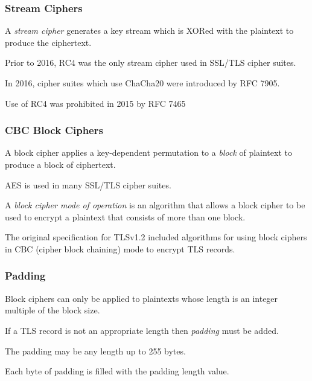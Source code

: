 \documentclass[aspectratio=169]{beamer}
\begin{document}
\begin{frame}[triangle=siiblue]
	\frametitle{Stream Ciphers}
	A \emph{stream cipher} generates a key stream which is XORed with the plaintext to produce the ciphertext.
	
	\vfill
	
	Prior to 2016, RC4 was the only stream cipher used in SSL/TLS cipher suites.
	
	\vfill
	
	In 2016, cipher suites which use ChaCha20 were introduced by RFC 7905.
	
	\vfill
	
	Use of RC4 was prohibited in 2015 by RFC 7465
\end{frame}

\begin{frame}[triangle=siiblue]
	\frametitle{CBC Block Ciphers}
	A block cipher applies a key-dependent permutation to a \emph{block} of plaintext to produce a block of ciphertext.
	
	\vfill
	
	AES is used in many SSL/TLS cipher suites.
	
	\vfill
	
	A \emph{block cipher mode of operation} is an algorithm that allows a block cipher to be used to encrypt a plaintext that consists of more than one block. 
	
	\vfill 
	
	The original specification for TLSv1.2 included algorithms for using block ciphers in CBC (cipher block chaining) mode to encrypt TLS records.
\end{frame}

%	
%	

\begin{frame}[triangle=siiblue]
	\frametitle{Padding}
	Block ciphers can only be applied to plaintexts whose length is an integer multiple of the block size.
	
	\vfill
	
	If a TLS record is not an appropriate length then \emph{padding} must be added.

	\vfill
	
	The padding may be any length up to 255 bytes.
	
	\vfill
	
	Each byte of padding is filled with the padding length value.
\end{frame}
\end{document}
